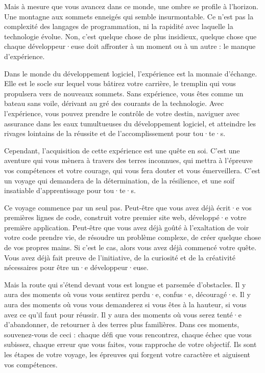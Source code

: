 Mais à mesure que vous avancez dans ce monde, une ombre se profile à l'horizon. Une montagne aux sommets enneigés qui semble insurmontable. Ce n'est pas la complexité des langages de programmation, ni la rapidité avec laquelle la technologie évolue. Non, c'est quelque chose de plus insidieux, quelque chose que chaque développeur·euse doit affronter à un moment ou à un autre : le manque d'expérience.

Dans le monde du développement logiciel, l'expérience est la monnaie d'échange. Elle est le socle sur lequel vous bâtirez votre carrière, le tremplin qui vous propulsera vers de nouveaux sommets. Sans expérience, vous êtes comme un bateau sans voile, dérivant au gré des courants de la technologie. Avec l'expérience, vous pouvez prendre le contrôle de votre destin, naviguer avec assurance dans les eaux tumultueuses du développement logiciel, et atteindre les rivages lointains de la réussite et de l'accomplissement pour tou·te·s.

Cependant, l'acquisition de cette expérience est une quête en soi. C'est une aventure qui vous mènera à travers des terres inconnues, qui mettra à l'épreuve vos compétences et votre courage, qui vous fera douter et vous émerveillera. C'est un voyage qui demandera de la détermination, de la résilience, et une soif insatiable d'apprentissage pour tou·te·s.

Ce voyage commence par un seul pas. Peut-être que vous avez déjà écrit·e vos premières lignes de code, construit votre premier site web, développé·e votre première application. Peut-être que vous avez déjà goûté à l'exaltation de voir votre code prendre vie, de résoudre un problème complexe, de créer quelque chose de vos propres mains. Si c'est le cas, alors vous avez déjà commencé votre quête. Vous avez déjà fait preuve de l'initiative, de la curiosité et de la créativité nécessaires pour être un·e développeur·euse.

Mais la route qui s'étend devant vous est longue et parsemée d'obstacles. Il y aura des moments où vous vous sentirez perdu·e, confus·e, découragé·e. Il y aura des moments où vous vous demanderez si vous êtes à la hauteur, si vous avez ce qu'il faut pour réussir. Il y aura des moments où vous serez tenté·e d'abandonner, de retourner à des terres plus familières. Dans ces moments, souvenez-vous de ceci : chaque défi que vous rencontrez, chaque échec que vous subissez, chaque erreur que vous faites, vous rapproche de votre objectif. Ils sont les étapes de votre voyage, les épreuves qui forgent votre caractère et aiguisent vos compétences.

